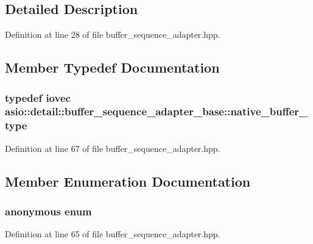 \subsection{Detailed Description}


Definition at line 28 of file buffer\+\_\+sequence\+\_\+adapter.\+hpp.



\subsection{Member Typedef Documentation}
\hypertarget{classasio_1_1detail_1_1buffer__sequence__adapter__base_a91d037bd052777b8df514e6b94ec9e71}{}
\subsubsection[{native\+\_\+buffer\+\_\+type}]{\setlength{\rightskip}{0pt plus 5cm}typedef iovec {\bf asio\+::detail\+::buffer\+\_\+sequence\+\_\+adapter\+\_\+base\+::native\+\_\+buffer\+\_\+type}\hspace{0.3cm}{\ttfamily [protected]}}\label{classasio_1_1detail_1_1buffer__sequence__adapter__base_a91d037bd052777b8df514e6b94ec9e71}


Definition at line 67 of file buffer\+\_\+sequence\+\_\+adapter.\+hpp.



\subsection{Member Enumeration Documentation}
\hypertarget{classasio_1_1detail_1_1buffer__sequence__adapter__base_a6c590e0974693b52fa61ed66c56e0e21}{}\subsubsection[{anonymous enum}]{\setlength{\rightskip}{0pt plus 5cm}anonymous enum\hspace{0.3cm}{\ttfamily [protected]}}\label{classasio_1_1detail_1_1buffer__sequence__adapter__base_a6c590e0974693b52fa61ed66c56e0e21}


Definition at line 65 of file buffer\+\_\+sequence\+\_\+adapter.\+hpp.



